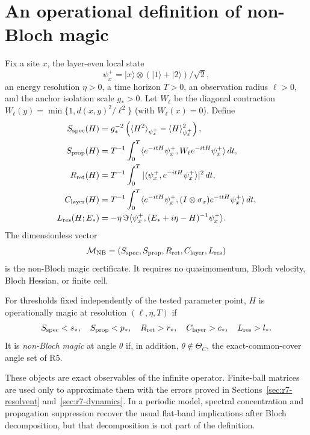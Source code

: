 \section{An operational definition of non-Bloch magic}
\label{sec:r7-definition}

Fix a site $x$, the layer-even local state
\begin{equation}
 \psi_x^+=|x\rangle\otimes(|1\rangle+|2\rangle)/\sqrt2,
\end{equation}
an energy resolution $\eta>0$, a time horizon $T>0$, an observation radius
$\ell>0$, and the anchor isolation scale $g_*>0$.  Let $W_\ell$ be the
diagonal contraction
$W_\ell(y)=\min\{1,d(x,y)^2/\ell^2\}$ (with $W_\ell(x)=0$).  Define
\begin{align}
 S_{\rm spec}(H)&=g_*^{-2}
 \left(\langle H^2\rangle_{\psi_x^+}
       -\langle H\rangle_{\psi_x^+}^2\right),\\
 S_{\rm prop}(H)&=T^{-1}\int_0^T
 \langle e^{-itH}\psi_x^+,W_\ell e^{-itH}\psi_x^+\rangle\,dt,\\
 R_{\rm ret}(H)&=T^{-1}\int_0^T
 |\langle\psi_x^+,e^{-itH}\psi_x^+\rangle|^2\,dt,\\
 C_{\rm layer}(H)&=T^{-1}\int_0^T
 \langle e^{-itH}\psi_x^+,
 (I\otimes\sigma_x)e^{-itH}\psi_x^+\rangle\,dt,\\
 L_{\rm res}(H;E_*)&=-\eta\,
 \Im\langle\psi_x^+,(E_*+i\eta-H)^{-1}\psi_x^+\rangle.
 \label{eq:r7-magic-vector}
\end{align}
The dimensionless vector
\begin{equation}
 \mathcal M_{\rm NB}=(S_{\rm spec},S_{\rm prop},R_{\rm ret},
 C_{\rm layer},L_{\rm res})
\end{equation}
is the non-Bloch magic certificate.  It requires no quasimomentum, Bloch
velocity, Bloch Hessian, or finite cell.

\begin{definition}
For thresholds fixed independently of the tested parameter point, $H$ is
operationally magic at resolution $(\ell,\eta,T)$ if
\begin{equation}
 S_{\rm spec}<s_*,\quad S_{\rm prop}<p_*,\quad
 R_{\rm ret}>r_*,\quad C_{\rm layer}>c_*,\quad L_{\rm res}>l_*.
 \label{eq:r7-strict-magic}
\end{equation}
It is \emph{non-Bloch magic} at angle $\theta$ if, in addition,
$\theta\notin\Theta_C$, the exact-common-cover angle set of R5.
\end{definition}

These objects are exact observables of the infinite operator.  Finite-ball
matrices are used only to approximate them with the errors proved in
Sections~\ref{sec:r7-resolvent} and~\ref{sec:r7-dynamics}.  In a periodic
model, spectral concentration and propagation suppression recover the usual
flat-band implications after Bloch decomposition, but that decomposition is
not part of the definition.
